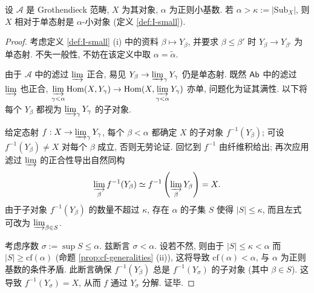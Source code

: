 \begin{lemma}\label{prop:alpha-small}
	设 $\mathcal{A}$ 是 Grothendieck 范畴, $X$ 为其对象, $\alpha$ 为正则小基数. 若 $\alpha > \kappa := |\mathrm{Sub}_X|$, 则 $X$ 相对于单态射是 $\alpha$-小对象 (定义 \ref{def:I-small}).
\end{lemma}
\begin{proof}
	考虑定义 \ref{def:I-small} (i) 中的资料 $\beta \mapsto Y_\beta$, 并要求 $\beta \leq \beta'$ 时 $Y_\beta \to Y_{\beta'}$ 为单态射. 不失一般性, 不妨在该定义中取 $\alpha = \tilde{\alpha}$.

	由于 $\mathcal{A}$ 中的滤过 $\varinjlim$ 正合, 易见 $Y_\beta \to \varinjlim_\gamma Y_\gamma$ 仍是单态射. 既然 $\mathsf{Ab}$ 中的滤过 $\varinjlim$ 也正合, $\displaystyle\varinjlim_{\gamma < \alpha} \operatorname{Hom}(X, Y_\gamma) \to \operatorname{Hom}(X, \displaystyle\varinjlim_{\gamma < \alpha} Y_\gamma)$ 亦单, 问题化为证其满性. 以下将每个 $Y_\beta$ 都视为 $\varinjlim_\gamma Y_\gamma$ 的子对象.
	
	给定态射 $f: X \to \varinjlim_\gamma Y_\gamma$, 每个 $\beta < \alpha$ 都确定 $X$ 的子对象 $f^{-1}(Y_\beta)$; 可设 $f^{-1}(Y_\beta) \neq X$ 对每个 $\beta$ 成立, 否则无劳论证. 回忆到 $f^{-1}$ 由纤维积给出; 再次应用滤过 $\varinjlim$ 的正合性导出自然同构
	\[ \varinjlim_\beta f^{-1}(Y_\beta) \simeq f^{-1} \left( \varinjlim_\beta Y_\beta \right) = X. \]
	由于子对象 $f^{-1}(Y_\beta)$ 的数量不超过 $\kappa$, 存在 $\alpha$ 的子集 $S$ 使得 $|S| \leq \kappa$, 而且左式可改为 $\varinjlim_{\beta \in S}$.
	
	考虑序数 $\sigma := \sup S \leq \alpha$. 兹断言 $\sigma < \alpha$. 设若不然, 则由于 $|S| \leq \kappa < \alpha$ 而 $|S| \geq \mathrm{cf}(\alpha)$ (命题 \ref{prop:cf-generalities} (ii)), 这将导致 $\mathrm{cf}(\alpha) < \alpha$, 与 $\alpha$ 为正则基数的条件矛盾. 此断言确保 $f^{-1}(Y_\beta)$ 总是 $f^{-1}(Y_\sigma)$ 的子对象 (其中 $\beta \in S$). 这导致 $f^{-1}(Y_\sigma) = X$, 从而 $f$ 通过 $Y_\sigma$ 分解. 证毕.
\end{proof}

